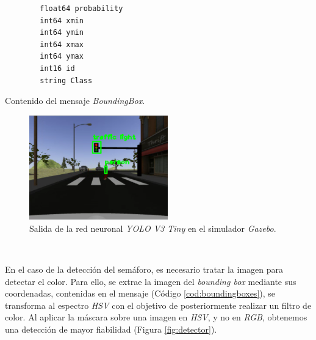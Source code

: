 \begin{code}[h]
	\begin{lstlisting}
		float64 probability
		int64 xmin
		int64 ymin
		int64 xmax
		int64 ymax
		int16 id
		string Class
	\end{lstlisting}
	\caption[Contenido del mensaje \textit{BoundingBox}.]{Contenido del mensaje \textit{BoundingBox}.}
	\label{cod:boundingboxes}
\end{code}

\begin{figure} [h!]
	\begin{center}
		\includegraphics[width=6cm]{figs/darknetSimulator}
	\end{center}
	\caption{Salida de la red neuronal \textit{YOLO V3 Tiny} en el simulador \textit{Gazebo}.}
	\label{fig:darknetsimulator}
\end{figure}\

En el caso de la detección del semáforo, es necesario tratar la imagen para detectar el color. Para ello, se extrae la imagen del \textit{bounding box} mediante sus coordenadas, contenidas en el mensaje (Código \ref{cod:boundingboxes}), se transforma al espectro \textit{HSV} con el objetivo de posteriormente realizar un filtro de color. Al aplicar la máscara sobre una imagen en \textit{HSV}, y no en \textit{RGB}, obtenemos una detección de mayor fiabilidad (Figura
\ref{fig:detector}).\\


